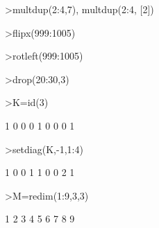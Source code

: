 \documentclass[12pt,arial,letterpaper]{book}
\begin{document}
\begin{eulercomment}
\begin{eulercomment}
\begin{eulercomment}
\begin{eulercomment}
\begin{euleroutput}
  [2,  3,  4,  2,  3,  4,  2,  3,  4,  2,  3,  4,  2,  3,  4,  2,  3,  4,
  2,  3,  4]
\end{euleroutput}
\begin{eulerprompt}
>multdup(2:4,7), multdup(2:4, [2])
\end{eulerprompt}
\begin{euleroutput}
  [2,  2,  2,  2,  2,  2,  2,  3,  3,  3,  3,  3,  3,  3,  4,  4,  4,  4,
  4,  4,  4]
  [2,  2,  3,  3,  4,  4]
\end{euleroutput}
\begin{eulerprompt}
>flipx(999:1005)
\end{eulerprompt}
\begin{euleroutput}
  [1005,  1004,  1003,  1002,  1001,  1000,  999]
\end{euleroutput}
\begin{eulerprompt}
>rotleft(999:1005)
\end{eulerprompt}
\begin{euleroutput}
  [1000,  1001,  1002,  1003,  1004,  1005,  999]
\end{euleroutput}
\begin{eulerprompt}
>drop(20:30,3)
\end{eulerprompt}
\begin{euleroutput}
  [20,  21,  23,  24,  25,  26,  27,  28,  29,  30]
\end{euleroutput}
\begin{eulerprompt}
>K=id(3)
\end{eulerprompt}
\begin{euleroutput}
              1             0             0 
              0             1             0 
              0             0             1 
\end{euleroutput}
\begin{eulerprompt}
>setdiag(K,-1,1:4)
\end{eulerprompt}
\begin{euleroutput}
              1             0             0 
              1             1             0 
              0             2             1 
\end{euleroutput}
\begin{eulerprompt}
>M=redim(1:9,3,3)
\end{eulerprompt}
\begin{euleroutput}
              1             2             3 
              4             5             6 
              7             8             9 

\end{euleroutput}
\end{eulercomment}
\end{eulercomment}
\end{eulercomment}
\end{eulercomment}
\end{document}
